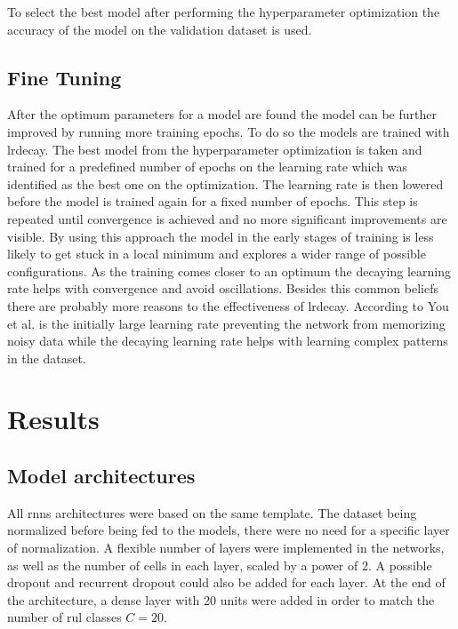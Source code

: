 \documentclass[conference]{IEEEtran}
\begin{document}
To select the best model after performing the hyperparameter optimization the accuracy of the model on the validation dataset is used.

\noindent
\subsection{Fine Tuning}

After the optimum parameters for a model are found the model can be further improved by running more training epochs. To do so the models are trained with \gls{lrdecay}. The best model from the hyperparameter optimization is taken and trained for a predefined number of epochs on the learning rate which was identified as the best one on the optimization. The learning rate is then lowered before the model is trained again for a fixed number of epochs. This step is repeated until convergence is achieved and no more significant improvements are visible. By using this approach the model in the early stages of training is less likely to get stuck in a local minimum and explores a wider range of possible configurations. As the training comes closer to an optimum the decaying learning rate helps with convergence and avoid oscillations. Besides this common beliefs there are probably more reasons to the effectiveness of \gls{lrdecay}. According to You et al. \cite{You2019} is the initially large learning rate preventing the network from memorizing noisy data while the decaying learning rate helps with learning complex patterns in the dataset.


\section{Results}
\label{sec:results}


\noindent
\subsection{Model architectures}

All \glspl{rnn} architectures were based on the same template. The dataset being normalized before being fed to the models, there were no need for a specific layer of normalization. A flexible number of layers were implemented in the networks, as well as the number of cells in each layer, scaled by a power of 2. A possible dropout and recurrent dropout could also be added for each layer. At the end of the architecture, a dense layer with 20 units were added in order to match the number of \gls{rul} classes $ C = 20 $.  
\end{document}
